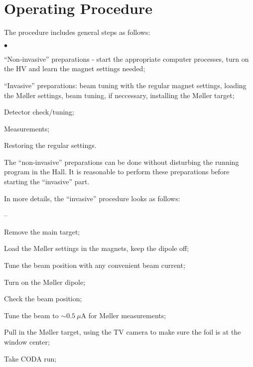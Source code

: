 {\section {Operating Procedure }
\label{sec:moller_oper}
\vspace{-\parskip}

The procedure includes general steps as follows: 
\vspace{-\parskip}
\begin{list}{$\bullet$}{\setlength{\itemsep}{-0.15cm}}
  \item ``Non-invasive'' preparations - start the appropriate
          computer processes, turn on the HV and learn the
          magnet settings needed;
  \item ``Invasive'' preparations: beam tuning with the regular
          magnet settings, loading the M{\o}ller settings,
          beam tuning, if neccessary, installing the M{\o}ller target;
  \item Detector check/tuning;
  \item Measurements;
  \item Restoring the regular settings.
\end{list}
The ``non-invasive'' preparations can be done without disturbing the running 
program in the Hall. It is reasonable to perform these preparations
before starting the ``invasive'' part.

In more details, the ``invasive'' procedure looks as follows:
\vspace{-\parskip}
 \begin{list}{--}{\setlength{\itemsep}{-0.15cm}}
   \item Remove the main target;
   \item Load the M{\o}ller settings in the magnets, keep the dipole off; 
   \item Tune the beam position with any convenient beam current;
   \item Turn on the M{\o}ller dipole; 
   \item Check the beam position;
   \item Tune the beam to $\sim{}0.5~\mu$A for M{\o}ller measurements; 
   \item Pull in the M{\o}ller target, using the TV camera to make sure the foil is at the
         window center;
   \item Take CODA run;
 \end{list}
}

